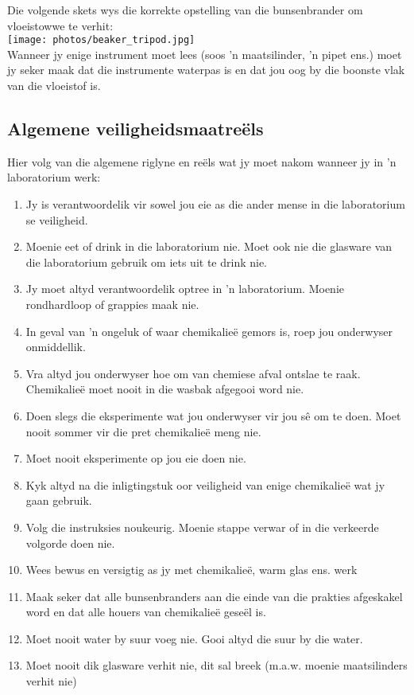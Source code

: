 \begin{table}[H]
Die volgende skets wys die korrekte opstelling van die bunsenbrander om vloeistowwe te verhit:\\
\texttt{[image: photos/beaker\_tripod.jpg]}\\
Wanneer jy enige instrument moet lees (soos  'n maatsilinder,  'n pipet ens.) moet jy seker maak dat die instrumente waterpas is en dat jou oog by die boonste vlak van die vloeistof is.

\subsection*{Algemene veiligheidsmaatreëls}
            \nopagebreak
Hier volg van die algemene riglyne en reëls wat jy moet nakom wanneer jy in  'n laboratorium werk:
\begin{enumerate}[noitemsep, label=\textbf{\arabic*}. ] 
\item Jy is verantwoordelik vir sowel jou eie as die ander mense in die laboratorium se veiligheid.
\item Moenie eet of drink in die laboratorium nie. Moet ook nie die glasware van die laboratorium gebruik om iets uit te drink nie.
\item Jy moet altyd verantwoordelik optree in  'n laboratorium. Moenie rondhardloop of grappies maak nie.
\item In geval van  'n ongeluk of waar chemikalieë gemors is, roep jou onderwyser onmiddellik.
\item Vra altyd jou onderwyser hoe om van chemiese afval ontslae te raak. Chemikalieë moet nooit in die wasbak afgegooi word nie.
\item Doen slegs die eksperimente wat jou onderwyser vir jou sê om te doen. Moet nooit sommer vir die pret chemikalieë meng nie.
\item Moet nooit eksperimente op jou eie doen nie. 
\item Kyk altyd na die inligtingstuk oor veiligheid van enige chemikalieë wat jy gaan gebruik. 
\item Volg die instruksies noukeurig. Moenie stappe verwar of in die verkeerde volgorde doen nie. 
\item Wees bewus en versigtig as jy met chemikalieë, warm glas ens. werk  
\item Maak seker dat alle bunsenbranders aan die einde van die prakties afgeskakel word en dat alle houers van chemikalieë geseël is.
\item Moet nooit water by suur voeg nie. Gooi altyd die suur by die water.
\item Moet nooit dik glasware verhit nie, dit sal breek (m.a.w. moenie maatsilinders verhit nie)

\end{enumerate}
\end{table}
